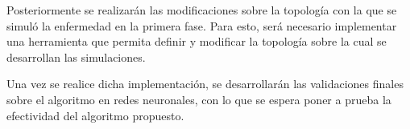Posteriormente se realizarán las modificaciones sobre la topología con la que se simuló la enfermedad en la primera fase. Para esto, será necesario implementar una herramienta que permita definir y modificar la topología sobre la cual se desarrollan las simulaciones.

Una vez se realice dicha implementación, se desarrollarán las validaciones finales sobre el algoritmo en redes neuronales, con lo que se espera poner a prueba la efectividad del algoritmo propuesto.